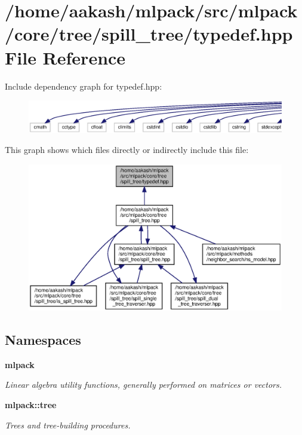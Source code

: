 \section{/home/aakash/mlpack/src/mlpack/core/tree/spill\+\_\+tree/typedef.hpp File Reference}
\label{core_2tree_2spill__tree_2typedef_8hpp}
Include dependency graph for typedef.\+hpp\+:
\nopagebreak
\begin{figure}[H]
\begin{center}
\leavevmode
\includegraphics[width=350pt]{core_2tree_2spill__tree_2typedef_8hpp__incl}
\end{center}
\end{figure}
This graph shows which files directly or indirectly include this file\+:
\nopagebreak
\begin{figure}[H]
\begin{center}
\leavevmode
\includegraphics[width=350pt]{core_2tree_2spill__tree_2typedef_8hpp__dep__incl}
\end{center}
\end{figure}
\subsection*{Namespaces}
\begin{DoxyCompactItemize}
\item 
 \textbf{ mlpack}
\begin{DoxyCompactList}\small\item\em Linear algebra utility functions, generally performed on matrices or vectors. \end{DoxyCompactList}\item 
 \textbf{ mlpack\+::tree}
\begin{DoxyCompactList}\small\item\em Trees and tree-\/building procedures. \end{DoxyCompactList}\end{DoxyCompactItemize}
